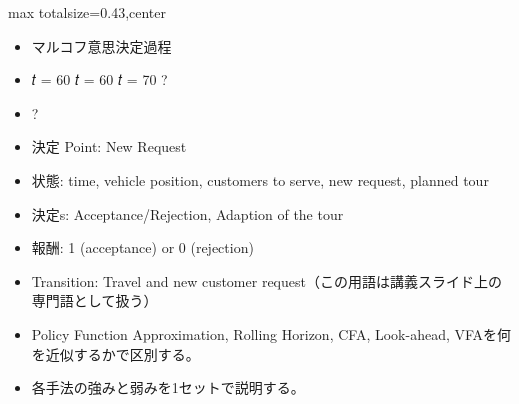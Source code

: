 \clearpage
{}
\begin{minipage}[t]{0.405\textwidth}
\begin{adjustbox}{max totalsize={\textwidth}{0.43\textheight},center}
\begin{minipage}{\textwidth}\scriptsize
{}\begin{itemize}
\item マルコフ意思決定過程
\item 𝑡 = 60 𝑡 = 60 𝑡 = 70 ?
\item ?
\item 決定 Point: New Request
\item 状態: time, vehicle position, customers to serve, new request, planned tour
\item 決定s: Acceptance/Rejection, Adaption of the tour
\item 報酬: 1 (acceptance) or 0 (rejection)
\item Transition: Travel and new customer request（この用語は講義スライド上の専門語として扱う）
\end{itemize}\begin{itemize}
\item Policy Function Approximation, Rolling Horizon, CFA, Look-ahead, VFAを何を近似するかで区別する。
\item 各手法の強みと弱みを1セットで説明する。
\end{itemize}
\end{minipage}
\end{adjustbox}
\end{minipage}\hfill
